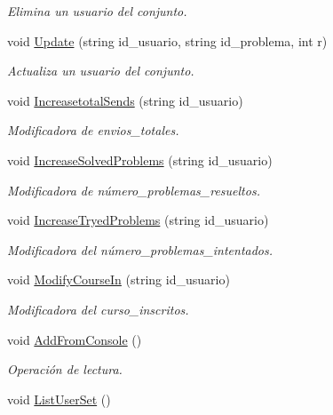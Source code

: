 \begin{DoxyCompactItemize}
\begin{DoxyCompactList}\small\item\em Elimina un usuario del conjunto. \end{DoxyCompactList}\item 
void \mbox{\hyperlink{class_user_set_aff81874263edfa786d5bf6f4f17c0425}{Update}} (string id\+\_\+usuario, string id\+\_\+problema, int r)
\begin{DoxyCompactList}\small\item\em Actualiza un usuario del conjunto. \end{DoxyCompactList}\item 
void \mbox{\hyperlink{class_user_set_a9900fead5f07b95a78418787914de06f}{Increasetotal\+Sends}} (string id\+\_\+usuario)
\begin{DoxyCompactList}\small\item\em Modificadora de envios\+\_\+totales. \end{DoxyCompactList}\item 
void \mbox{\hyperlink{class_user_set_a7462310142b0f573b51708d9eb7ead56}{Increase\+Solved\+Problems}} (string id\+\_\+usuario)
\begin{DoxyCompactList}\small\item\em Modificadora de número\+\_\+problemas\+\_\+resueltos. \end{DoxyCompactList}\item 
void \mbox{\hyperlink{class_user_set_aaba14c5d99e15bc568bf6985e77c85af}{Increase\+Tryed\+Problems}} (string id\+\_\+usuario)
\begin{DoxyCompactList}\small\item\em Modificadora del número\+\_\+problemas\+\_\+intentados. \end{DoxyCompactList}\item 
void \mbox{\hyperlink{class_user_set_af618063be593ccc2c3605a7d75773437}{Modify\+Course\+In}} (string id\+\_\+usuario)
\begin{DoxyCompactList}\small\item\em Modificadora del curso\+\_\+inscritos. \end{DoxyCompactList}\item 
void \mbox{\hyperlink{class_user_set_a4618efff11bc85371b754ee58e138ba4}{Add\+From\+Console}} ()
\begin{DoxyCompactList}\small\item\em Operación de lectura. \end{DoxyCompactList}\item 
void \mbox{\hyperlink{class_user_set_a0d096b2eec4c9b5feb4a1d7c8e6d3ef6}{List\+User\+Set}} ()

\end{DoxyCompactItemize}
